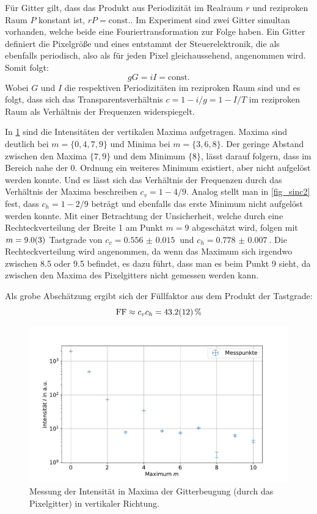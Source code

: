 \documentclass[
	a4paper,
	12pt,
	pagesize,
	ngerman
]{scrartcl}
\begin{document}
		Für Gitter gilt, dass das Produkt aus Periodizität im Realraum $r$ und reziproken Raum $P$ konstant ist, $rP=\text{const.}$.
		Im Experiment sind zwei Gitter simultan vorhanden, welche beide eine Fouriertransformation zur Folge haben.
		Ein Gitter definiert die Pixelgröße und eines entstammt der Steuerelektronik, die als ebenfalls periodisch, also als für jeden Pixel gleichaussehend, angenommen wird.
		Somit folgt:
		\begin{equation}
			gG =iI = \text{const.}
		\end{equation}
		Wobei $G$ und $I$ die respektiven Periodizitäten im reziproken Raum sind und es folgt, dass sich das Transparentsverhältnis $c=1-i/g=1-I/T$ im reziproken Raum als Verhältnis der Frequenzen widerspiegelt.

		In \cref{fig_sinc1} sind die Intensitäten der vertikalen Maxima aufgetragen.
		Maxima sind deutlich bei $m=\{0,4,7,9\}$ und Minima bei $m=\{3,6,8\}$.
		Der geringe Abstand zwischen den Maxima $\{7,9\}$ und dem Minimum $\{8\}$, lässt darauf folgern, dass im Bereich nahe der 0. Ordnung ein weiteres Minimum existiert, aber nicht aufgelöst werden konnte.
		Und es lässt sich das Verhältnis der Frequenzen durch das Verhältnis der Maxima beschreiben $c_v=1-4/9$.
		Analog stellt man in \cref{fig_sinc2} fest, dass $c_h=1-2/9$ beträgt und ebenfalls das erste Minimum nicht aufgelöst werden konnte.
		Mit einer Betrachtung der Unsicherheit, welche durch eine Rechteckverteilung der Breite 1 am Punkt $m=9$ abgeschätzt wird, folgen mit $m=\SI{9+-0.3}{}$ Tastgrade von $c_v=\SI{0.556(15)}{}$ und $c_h=\SI{0.778(7)}{}$.
		Die Rechteckverteilung wird angenommen, da wenn das Maximum sich irgendwo zwischen \num{8,5} oder \num{9,5} befindet, es dazu führt, dass man es beim Punkt \num{9} sieht, da zwischen den Maxima des Pixelgitters nicht gemessen werden kann.

		Als grobe Abschätzung ergibt sich der Füllfaktor aus dem Produkt der Tastgrade:
		\begin{equation}
			\text{FF} \approx c_v c_h =\SI{43.2+-1.2}{\percent}
		\end{equation}


\begin{figure}[H]
			\includegraphics[width=0.8\linewidth]{img/sinc1}
			\caption{
			Messung der Intensität in Maxima der Gitterbeugung (durch das Pixelgitter) in vertikaler Richtung.
			}
			\label{fig_sinc1}
	\end{figure}
\end{document}
